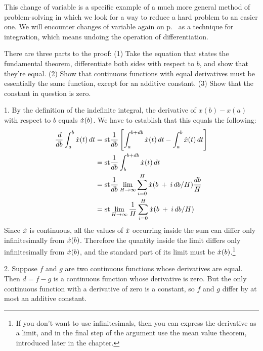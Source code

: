 This change of variable is a specific example of a much more general method of problem-solving in which we look for a way to reduce a hard problem
to an easier one. We will encounter changes of variable again on p.~\pageref{change-of-variable-for-integration} as a technique for
integration, which means undoing the operation of differentiation.


There are three parts to the proof: (1)  Take the equation that states
the fundamental theorem, differentiate both sides with respect to $b$, and show that they're equal.
(2) Show that continuous functions with equal derivatives must be essentially the same function, except for an
additive constant. (3) Show that the constant in question is zero.

1. By the definition of the indefinite integral, the derivative of $x(b)-x(a)$ with respect to $b$ equals
$\dot{x}(b)$. We have to establish that this equals the following:
\begin{align*}
  \frac{\der}{\der b} \int_a^b \xdot(t) \der t 
    &= \st \frac{1}{\der b}\left[\int_a^{b+\der b}  \xdot(t) \der t - \int_a^b  \xdot(t) \der t\right] \\
    &= \st \frac{1}{\der b}\int_b^{b+\der b}  \xdot(t) \der t \\
    &= \st \frac{1}{\der b}\lim_{H\rightarrow\infty} \sum_{i=0}^H  \xdot(b\:+\:i\der b/H) \frac{\der b}{H} \\
    &= \st \lim_{H\rightarrow\infty} \frac{1}{H} \sum_{i=0}^H  \xdot(b\:+\:i\der b/H)
\end{align*}
Since $\dot{x}$ is continuous, all the values of $\dot{x}$ occurring inside the sum can differ
only infinitesimally from $\dot{x}(b)$. Therefore the quantity inside the limit differs only infinitesimally from
$\dot{x}(b)$, and the standard part of its limit must be $\dot{x}(b)$.\footnote{If you don't want to use infinitesimals,
then you can express the derivative as a limit, and in the final step of the argument use the mean value theorem,
introduced later in the chapter.}

2. Suppose $f$ and $g$ are two continuous functions whose derivatives are equal. Then $d=f-g$ is a continuous function whose derivative is zero.
But the only continuous function with a derivative of zero is a constant, so $f$ and $g$ differ by at most an additive constant.

